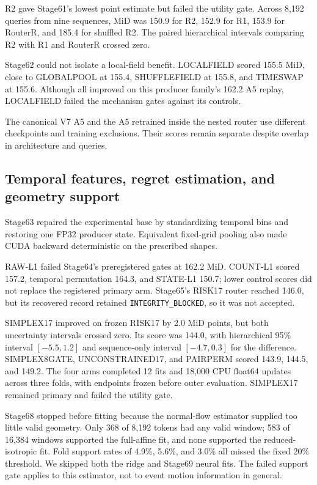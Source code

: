 

R2 gave Stage61's lowest point estimate but failed the utility gate. Across 8,192 queries from nine sequences, MiD was 150.9 for R2, 152.9 for R1, 153.9 for RouterR, and 185.4 for shuffled R2. The paired hierarchical intervals comparing R2 with R1 and RouterR crossed zero. 

Stage62 could not isolate a local-field benefit. LOCALFIELD scored 155.5 MiD, close to GLOBALPOOL at 155.4, SHUFFLEFIELD at 155.8, and TIMESWAP at 155.6. Although all improved on this producer family's 162.2 A5 replay, LOCALFIELD failed the mechanism gates against its controls. 

The canonical V7 A5 and the A5 retrained inside the nested router use different checkpoints and training exclusions. Their scores remain separate despite overlap in architecture and queries.

\subsection{Temporal features, regret estimation, and geometry support}

Stage63 repaired the experimental base by standardizing temporal bins and restoring one FP32 producer state. Equivalent fixed-grid pooling also made CUDA backward deterministic on the prescribed shapes. 

RAW-L1 failed Stage64's preregistered gates at 162.2 MiD. COUNT-L1 scored 157.2, temporal permutation 164.3, and STATE-L1 150.7; lower control scores did not replace the registered primary arm. Stage65's RISK17 router reached 146.0, but its recovered record retained \texttt{INTEGRITY\_BLOCKED}, so it was not accepted. 

SIMPLEX17 improved on frozen RISK17 by 2.0 MiD points, but both uncertainty intervals crossed zero. Its score was 144.0, with hierarchical 95\% interval $[-5.5,1.2]$ and sequence-only interval $[-4.7,0.3]$ for the difference. SIMPLEX8GATE, UNCONSTRAINED17, and PAIRPERM scored 143.9, 144.5, and 149.2. The four arms completed 12 fits and 18,000 CPU float64 updates across three folds, with endpoints frozen before outer evaluation. SIMPLEX17 remained primary and failed the utility gate. 

Stage68 stopped before fitting because the normal-flow estimator supplied too little valid geometry. Only 368 of 8,192 tokens had any valid window; 583 of 16,384 windows supported the full-affine fit, and none supported the reduced-isotropic fit. Fold support rates of 4.9\%, 5.6\%, and 3.0\% all missed the fixed 20\% threshold. We skipped both the ridge and Stage69 neural fits. The failed support gate applies to this estimator, not to event motion information in general. 

